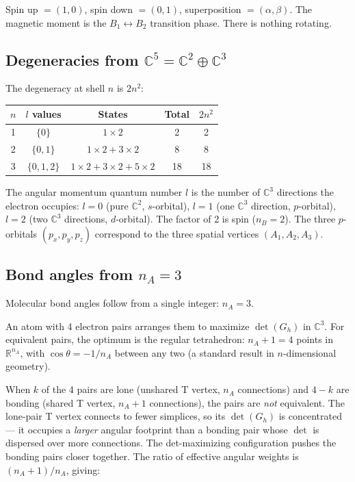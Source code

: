 \documentclass[12pt]{article}
\theoremstyle{remark}
\theoremstyle{definition}
\begin{document}
Spin up $= (1, 0)$, spin down $= (0, 1)$, superposition $= (\alpha, \beta)$. The magnetic moment is the $B_1 \leftrightarrow B_2$ transition phase. There is nothing rotating.

\subsection{Degeneracies from $\mathbb{C}^5 = \mathbb{C}^2 \oplus \mathbb{C}^3$}

The degeneracy at shell $n$ is $2n^2$:
\begin{center}
\begin{tabular}{ccccc}
\hline
$n$ & $l$ values & States & Total & $2n^2$ \\
\hline
1 & $\{0\}$ & $1 \times 2$ & 2 & 2 \\
2 & $\{0, 1\}$ & $1 \times 2 + 3 \times 2$ & 8 & 8 \\
3 & $\{0, 1, 2\}$ & $1 \times 2 + 3 \times 2 + 5 \times 2$ & 18 & 18 \\
\hline
\end{tabular}
\end{center}

The angular momentum quantum number $l$ is the number of $\mathbb{C}^3$ directions the electron occupies: $l = 0$ (pure $\mathbb{C}^2$, $s$-orbital), $l = 1$ (one $\mathbb{C}^3$ direction, $p$-orbital), $l = 2$ (two $\mathbb{C}^3$ directions, $d$-orbital). The factor of 2 is spin ($n_B = 2$). The three $p$-orbitals $(p_x, p_y, p_z)$ correspond to the three spatial vertices $(A_1, A_2, A_3)$.

\subsection{Bond angles from $n_A = 3$}

Molecular bond angles follow from a single integer: $n_A = 3$.

An atom with 4 electron pairs arranges them to maximize $\det(G_h)$ in $\mathbb{C}^3$. For equivalent pairs, the optimum is the regular tetrahedron: $n_A + 1 = 4$ points in $\mathbb{R}^{n_A}$, with $\cos\theta = -1/n_A$ between any two (a standard result in $n$-dimensional geometry).

When $k$ of the 4 pairs are lone (unshared T vertex, $n_A$ connections) and $4-k$ are bonding (shared T vertex, $n_A + 1$ connections), the pairs are \emph{not} equivalent. The lone-pair T vertex connects to fewer simplices, so its $\det(G_h)$ is concentrated --- it occupies a \emph{larger} angular footprint than a bonding pair whose $\det$ is dispersed over more connections. The det-maximizing configuration pushes the bonding pairs closer together. The ratio of effective angular weights is $(n_A + 1)/n_A$, giving:
\end{document}
